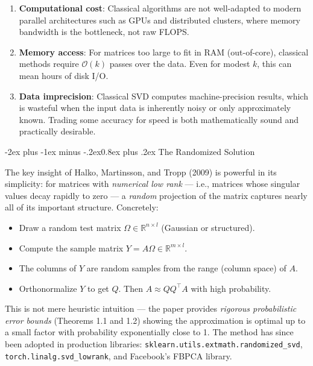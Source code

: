 \documentclass[12pt,a4paper]{article}
\makeatletter
\renewcommand{\subsection}{\@startsection{subsection}{2}{\z@}
  {-2ex plus -1ex minus -.2ex}{0.8ex plus .2ex}
  {\normalsize\bfseries\color{deepblue}}}
\makeatother
\begin{document}
\begin{enumerate}[leftmargin=2em, itemsep=3pt]
  \item \textbf{Computational cost}: Classical algorithms are not well-adapted to modern
    parallel architectures such as GPUs and distributed clusters, where memory bandwidth
    is the bottleneck, not raw FLOPS.
  \item \textbf{Memory access}: For matrices too large to fit in RAM (out-of-core), classical
    methods require $\mathcal{O}(k)$ passes over the data. Even for modest $k$, this can
    mean hours of disk I/O.
  \item \textbf{Data imprecision}: Classical SVD computes machine-precision results, which
    is wasteful when the input data is inherently noisy or only approximately known.
    Trading some accuracy for speed is both mathematically sound and practically desirable.
\end{enumerate}

\subsection{The Randomized Solution}

The key insight of Halko, Martinsson, and Tropp (2009) is powerful in its simplicity:
for matrices with \emph{numerical low rank} --- i.e., matrices whose singular values
decay rapidly to zero --- a \emph{random} projection of the matrix captures nearly
all of its important structure. Concretely:

\begin{itemize}[leftmargin=1.8em, itemsep=2pt]
  \item Draw a random test matrix $\Omega \in \mathbb{R}^{n \times l}$ (Gaussian or structured).
  \item Compute the sample matrix $Y = A\Omega \in \mathbb{R}^{m \times l}$.
  \item The columns of $Y$ are random samples from the range (column space) of $A$.
  \item Orthonormalize $Y$ to get $Q$. Then $A \approx QQ^\top A$ with high probability.
\end{itemize}

This is not mere heuristic intuition --- the paper provides \emph{rigorous probabilistic
error bounds} (Theorems 1.1 and 1.2) showing the approximation is optimal up to a small
factor with probability exponentially close to 1. The method has since been adopted in
production libraries: \texttt{sklearn.utils.extmath.randomized\_svd},
\texttt{torch.linalg.svd\_lowrank}, and Facebook's FBPCA library.
\end{document}
